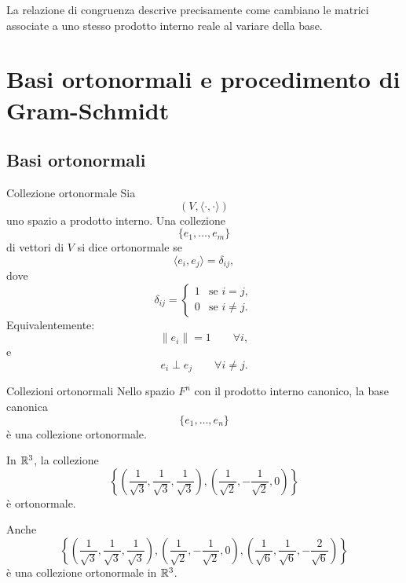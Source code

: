 \documentclass[a4paper]{article}
\begin{document}
La relazione di congruenza descrive precisamente come cambiano le matrici associate a uno stesso prodotto interno reale al variare della base.

\section{Basi ortonormali e procedimento di Gram-Schmidt}

\subsection{Basi ortonormali}

\begin{snippetdefinition}{Collezione ortonormale}
    Sia
    \[
        (V,\langle\cdot,\cdot\rangle)
    \]
    uno spazio a prodotto interno. Una collezione
    \[
        \{e_1,\ldots,e_m\}
    \]
    di vettori di \(V\) si dice ortonormale se
    \[
        \langle e_i,e_j\rangle=\delta_{ij},
    \]
    dove
    \[
        \delta_{ij}
        =
        \begin{cases}
            1 & \text{se } i=j,\\
            0 & \text{se } i\neq j.
        \end{cases}
    \]
    Equivalentemente:
    \[
        \|e_i\|=1
        \qquad
        \forall i,
    \]
    e
    \[
        e_i\perp e_j
        \qquad
        \forall i\neq j.
    \]
\end{snippetdefinition}

\begin{snippetexample}{Collezioni ortonormali}
    Nello spazio \(F^n\) con il prodotto interno canonico, la base canonica
    \[
        \{e_1,\ldots,e_n\}
    \]
    è una collezione ortonormale.

    In \(\mathbb{R}^3\), la collezione
    \[
        \left\{
            \left(\frac{1}{\sqrt{3}},\frac{1}{\sqrt{3}},\frac{1}{\sqrt{3}}\right),
            \left(\frac{1}{\sqrt{2}},-\frac{1}{\sqrt{2}},0\right)
        \right\}
    \]
    è ortonormale.

    Anche
    \[
        \left\{
            \left(\frac{1}{\sqrt{3}},\frac{1}{\sqrt{3}},\frac{1}{\sqrt{3}}\right),
            \left(\frac{1}{\sqrt{2}},-\frac{1}{\sqrt{2}},0\right),
            \left(\frac{1}{\sqrt{6}},\frac{1}{\sqrt{6}},-\frac{2}{\sqrt{6}}\right)
        \right\}
    \]
    è una collezione ortonormale in \(\mathbb{R}^3\).
\end{snippetexample}
\end{document}
